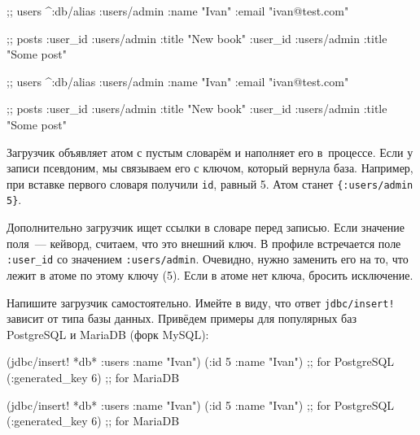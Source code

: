 \begin{english}
  \begin{clojure}
;; users
^{:db/alias :users/admin}
 {:name "Ivan" :email "ivan@test.com"}

;; posts
{:user_id :users/admin
 :title "New book"}
{:user_id :users/admin
 :title "Some post"}
  \end{clojure}
\end{english}

\else

\begin{english}
  \begin{clojure}
;; users
^{:db/alias :users/admin}
 {:name "Ivan" :email "ivan@test.com"}

;; posts
{:user_id :users/admin :title "New book"}
{:user_id :users/admin :title "Some post"}
  \end{clojure}
\end{english}

\fi

Загрузчик объявляет атом с пустым словарём и наполняет его в~процессе. Если у
записи псевдоним, мы связываем его с ключом, который вернула база. Например, при
вставке первого словаря получили \verb|id|, равный 5. Атом станет
\verb|{:users/admin 5}|.

Дополнительно загрузчик ищет ссылки в словаре перед записью. Если значение
поля~--- кейворд, считаем, что это внешний ключ. В профиле встречается поле
\verb|:user_id| со значением \verb|:users/admin|. Очевидно, нужно заменить
его на то, что лежит в атоме по этому ключу (5). Если в атоме нет ключа,
бросить исключение.


Напишите загрузчик самостоятельно. Имейте в виду, что ответ
\verb|jdbc/insert!| зависит от типа базы данных. Привёдем примеры для
популярных баз PostgreSQL и MariaDB (форк MySQL):

\ifx\DEVICETYPE\MOBILE

\begin{english}
  \begin{clojure}
(jdbc/insert! *db*
  :users {:name "Ivan"})
({:id 5 :name "Ivan"}) ;; for PostgreSQL
({:generated_key 6})   ;; for MariaDB
  \end{clojure}
\end{english}

\else

\begin{english}
  \begin{clojure}
(jdbc/insert! *db* :users {:name "Ivan"})
({:id 5 :name "Ivan"}) ;; for PostgreSQL
({:generated_key 6})   ;; for MariaDB
  \end{clojure}
\end{english}

